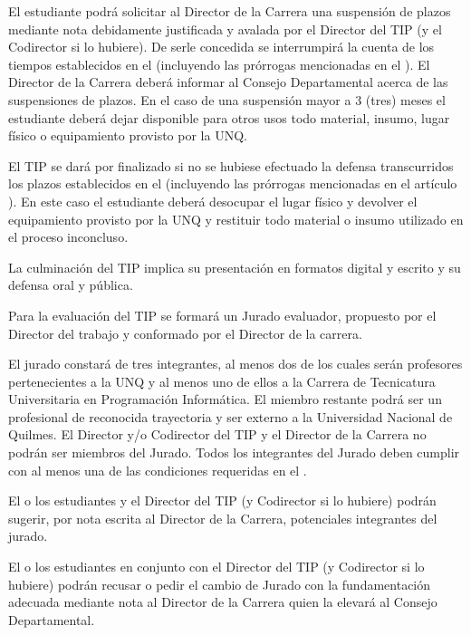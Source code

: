 \articulo El estudiante podrá solicitar al Director de la Carrera una
suspensión de plazos mediante nota debidamente justificada y avalada por el Director
del TIP (y el Codirector si lo hubiere). De serle concedida se interrumpirá la cuenta de
los tiempos establecidos en el \artTiempo (incluyendo las prórrogas mencionadas
en el \artProrrogas). El Director de la Carrera deberá informar al Consejo
Departamental acerca de las suspensiones de plazos. En el caso de una suspensión mayor a 3 (tres)
meses el estudiante deberá dejar disponible para otros usos todo material, insumo,
lugar físico o equipamiento provisto por la UNQ.

\articulo {} El TIP se dará por finalizado si no se hubiese
efectuado la defensa transcurridos los plazos establecidos en el \artTiempo
(incluyendo las prórrogas mencionadas en el artículo \artProrrogas). En este
caso el estudiante deberá desocupar el lugar físico y devolver el equipamiento provisto por la UNQ y restituir todo material o insumo
utilizado en el proceso inconcluso.


\articulo La culminación del TIP implica su presentación en formatos digital y
 escrito y su defensa oral y pública.

\articulo Para la evaluación del TIP se formará
un Jurado evaluador, propuesto por el Director del trabajo y conformado por el
Director de la carrera.

\articulo El jurado constará de tres integrantes, al menos dos de los cuales
serán profesores pertenecientes a la UNQ y al menos uno de ellos a la Carrera de
Tecnicatura Universitaria en Programación Informática. El miembro restante podrá ser
un profesional de reconocida trayectoria y ser externo a la Universidad Nacional de
Quilmes. El Director y/o Codirector del TIP y el Director de la Carrera no podrán ser
miembros del Jurado. Todos los integrantes del Jurado deben cumplir con al menos
una de las condiciones requeridas en el \artCondDirector.

\articulo El o los estudiantes y el Director del TIP (y Codirector si lo
hubiere) podrán sugerir, por nota escrita al Director de la Carrera, potenciales
integrantes del jurado.

\articulo El o los estudiantes en conjunto con el Director del TIP (y
Codirector si lo hubiere) podrán recusar o pedir el cambio de Jurado con la
fundamentación adecuada mediante nota al Director de la Carrera quien la elevará al
Consejo Departamental.

